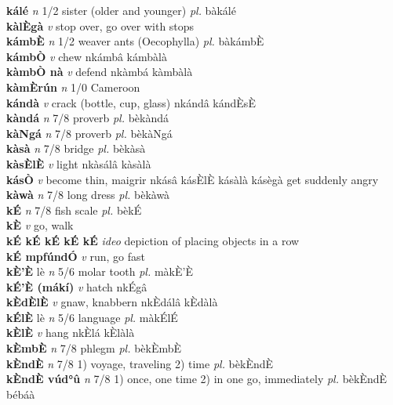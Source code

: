 \documentclass{article}
\begin{document}
{\bf kálé}  {\it n} 1/2 sister (older and younger) {\it pl.} bàkálé         \\ 
{\bf kàlÈgà}  {\it v} stop over, go over with stops         \\ 
{\bf kámbÈ}  {\it n} 1/2 weaver ants (Oecophylla) {\it pl.} bàkámbÈ         \\ 
{\bf kámbÒ}  {\it v} chew   nkámbâ   kámbàlà   \\ 
{\bf kàmbÒ nà}  {\it v} defend   nkàmbá   kàmbàlà   \\ 
{\bf kàmÈrún}  {\it n} 1/0 Cameroon         \\ 
{\bf kándà}  {\it v} crack (bottle, cup, glass)   nkándâ  kándÈsÈ    \\ 
{\bf kàndá}  {\it n} 7/8 proverb {\it pl.} bèkàndá         \\ 
{\bf kàNgá}  {\it n} 7/8 proverb {\it pl.} bèkàNgá         \\ 
{\bf kàsà}  {\it n} 7/8 bridge {\it pl.} bèkàsà         \\ 
{\bf kàsÈlÈ}  {\it v} light   nkàsálâ   kàsàlà   \\ 
{\bf kásÒ}  {\it v} become thin, maigrir   nkásâ kásÈlÈ  kásàlà kásègà get suddenly angry  \\ 
{\bf kàwà}  {\it n} 7/8 long dress {\it pl.} bèkàwà         \\ 
{\bf kÉ}  {\it n} 7/8 fish scale {\it pl.} bèkÉ         \\ 
{\bf kÈ}  {\it v} go, walk         \\ 
{\bf kÉ kÉ kÉ kÉ kÉ}  {\it ideo} depiction of placing objects in a row         \\ 
{\bf kÉ mpfúndÓ}  {\it v} run, go fast         \\ 
{\bf kÈ'È} lè {\it n} 5/6 molar tooth {\it pl.} màkÈ'È         \\ 
{\bf kÉ'È (mákí)}  {\it v} hatch   nkÉgâ      \\ 
{\bf kÈdÈlÈ}  {\it v} gnaw, knabbern   nkÈdálâ   kÈdàlà   \\ 
{\bf kÉlÈ} lè {\it n} 5/6 language {\it pl.} màkÉlÉ         \\ 
{\bf kÈlÈ}  {\it v} hang   nkÈlá   kÈlàlà   \\ 
{\bf kÈmbÈ}  {\it n} 7/8 phlegm {\it pl.} bèkÈmbÈ         \\ 
{\bf kÈndÈ}  {\it n} 7/8 1) voyage, traveling 2) time {\it pl.} bèkÈndÈ         \\ 
{\bf kÈndÈ vúd°û}  {\it n} 7/8 1) once, one time 2) in one go, immediately {\it pl.} bèkÈndÈ bébáà         \\ 
\end{document}
